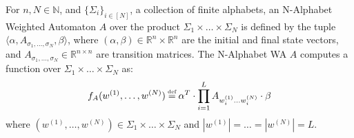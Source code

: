 
\begin{definition} \label{def:nletterwa}

For $n,N \in \mathbb{N}$, and $\{\Sigma_{i}\}_{i \in [N]}$, a collection of finite alphabets, an N-Alphabet Weighted Automaton $A$ over the product $\Sigma_{1} \times \ldots \times \Sigma_{N}$ is defined by the tuple $\langle\alpha, {A_{\sigma_{1}, \ldots ,\sigma_{N}}}, \beta\rangle$, where $(\alpha, \beta) \in \mathbb{R}^{n}\times \mathbb{R}^{n}$ are the initial and final state vectors, and $A_{\sigma_{1}, \ldots ,\sigma_{N}} \in \mathbb{R}^{n \times n}$ are transition matrices. The N-Alphabet WA $A$ computes a function over $\Sigma_{1}^{} \times \ldots \times \Sigma_{N}^{}$ as: 
$$f_{A}(w^{(1)}, \ldots , w^{(N)}) \myeq \alpha^{T} \cdot \prod\limits_{i=1}^{L}
   A_{w_{i}^{(1)} \ldots w_{i}^{(N)}} \cdot \beta$$ where $(w^{(1)}, \ldots , w^{(N)}) \in \Sigma_{1}^{} \times \ldots \times \Sigma_{N}^{}$ and $|w^{(1)}| = \ldots = |w^{(N)}| = L$.




\end{definition}

